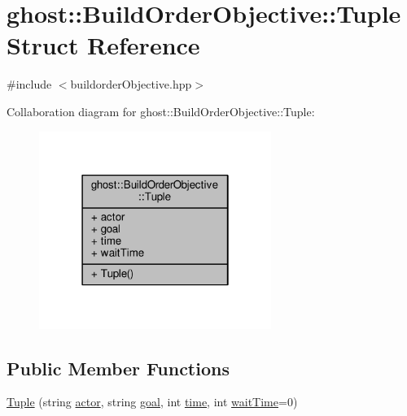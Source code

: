 \hypertarget{structghost_1_1BuildOrderObjective_1_1Tuple}{\section{ghost\-:\-:Build\-Order\-Objective\-:\-:Tuple Struct Reference}
\label{structghost_1_1BuildOrderObjective_1_1Tuple}
}


{\ttfamily \#include $<$buildorder\-Objective.\-hpp$>$}



Collaboration diagram for ghost\-:\-:Build\-Order\-Objective\-:\-:Tuple\-:
\nopagebreak
\begin{figure}[H]
\begin{center}
\leavevmode
\includegraphics[width=214pt]{structghost_1_1BuildOrderObjective_1_1Tuple__coll__graph}
\end{center}
\end{figure}
\subsection*{Public Member Functions}
\begin{DoxyCompactItemize}
\item 
\hyperlink{structghost_1_1BuildOrderObjective_1_1Tuple_a2e39311bd4a70a6b2c5121e0e6beee6c}{Tuple} (string \hyperlink{structghost_1_1BuildOrderObjective_1_1Tuple_a3e53211ec4154162d687c95b315d2c18}{actor}, string \hyperlink{structghost_1_1BuildOrderObjective_1_1Tuple_ab6d651fc9c2618fb4b6a97df7909c521}{goal}, int \hyperlink{structghost_1_1BuildOrderObjective_1_1Tuple_aec2af8e329fe4c3929d9a54462b92476}{time}, int \hyperlink{structghost_1_1BuildOrderObjective_1_1Tuple_acf901355f413337aa9b553e89eedd491}{wait\-Time}=0)
\end{DoxyCompactItemize}
